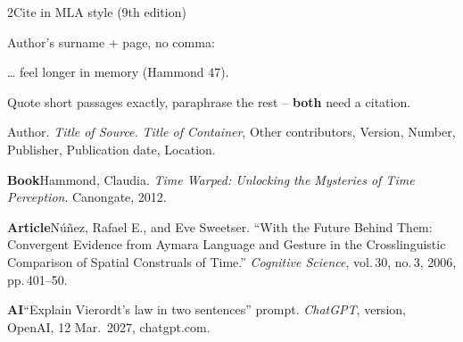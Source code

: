 \begin{wsbox}{2}{Cite in MLA style (9th edition)}
\begin{minipage}[t]{0.36\linewidth}\vspace{0pt}
\par\vspace{0.4mm}
Author's surname + page, no comma:\par
{\small … feel longer in memory (Hammond 47).}\par\vspace{0.6mm}
Quote short passages exactly, paraphrase the rest – \textbf{both} need a citation.\par\vspace{0.6mm}
\end{minipage}\hfill
\begin{minipage}[t]{0.61\linewidth}\vspace{0pt}
\par\vspace{0.4mm}
\begin{tintbox}\small
Author. \emph{Title of Source.} \emph{Title of Container}, Other contributors, Version, Number, Publisher, Publication date, Location.
\end{tintbox}\par\vspace{0.6mm}
{\small\setlength{\parindent}{-4mm}\leftskip=4mm
\textbf{Book}\enspace Hammond, Claudia. \emph{Time Warped: Unlocking the Mysteries of Time Perception}. Canongate, 2012.\par
\textbf{Article}\enspace Núñez, Rafael E., and Eve Sweetser. “With the Future Behind Them: Convergent Evidence from Aymara Language and Gesture in the Crosslinguistic Comparison of Spatial Construals of Time.” \emph{Cognitive Science}, vol.\,30, no.\,3, 2006, pp.\,401–50.\par
\textbf{AI}\enspace “Explain Vierordt's law in two sentences” prompt. \emph{ChatGPT}, version, OpenAI, 12 Mar.\ 2027, chatgpt.com.\par}
\end{minipage}
\end{wsbox}

